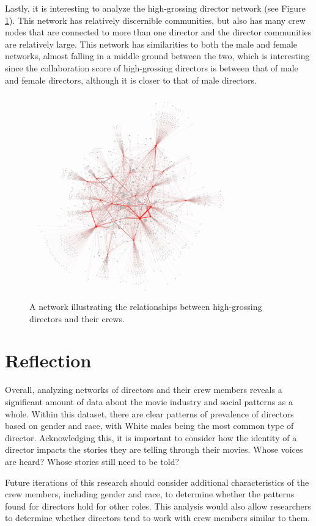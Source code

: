 \documentclass[12pt]{article}
\begin{document}
Lastly, it is interesting to analyze the high-grossing director network (see Figure \ref{fig:highEgo}). This network has relatively discernible communities, but also has many crew nodes that are connected to more than one director and the director communities are relatively large. This network has similarities to both the male and female networks, almost falling in a middle ground between the two, which is interesting since the collaboration score of high-grossing directors is between that of male and female directors, although it is closer to that of male directors.
\begin{figure}[H]
    \centering
    \includegraphics[width=250pt, scale=0.5] {3_highgrossing_egonetwork.jpg}
    \caption{A network illustrating the relationships between high-grossing directors and their crews.}
    \label{fig:highEgo}
\end{figure}
\section*{Reflection}
Overall, analyzing networks of directors and their crew members reveals a significant amount of data about the movie industry and social patterns as a whole. Within this dataset, there are clear patterns of prevalence of directors based on gender and race, with White males being the most common type of director. Acknowledging this, it is important to consider how the identity of a director impacts the stories they are telling through their movies. Whose voices are heard? Whose stories still need to be told?
\par
Future iterations of this research should consider additional characteristics of the crew members, including gender and race, to determine whether the patterns found for directors hold for other roles. This analysis would also allow researchers to determine whether directors tend to work with crew members similar to them.
\end{document}
